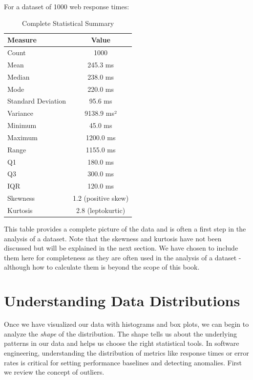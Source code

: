 \begin{example}

For a dataset of 1000 web response times:

\begin{table}[htbp]
\centering
\renewcommand{\arraystretch}{1.3}
\begin{tabular}{|l|c|}
\hline
\textbf{Measure} & \textbf{Value} \\
\hline
Count & 1000 \\
Mean & 245.3 ms \\
Median & 238.0 ms \\
Mode & 220.0 ms \\
Standard Deviation & 95.6 ms \\
Variance & 9138.9 ms² \\
Minimum & 45.0 ms \\
Maximum & 1200.0 ms \\
Range & 1155.0 ms \\
Q1 & 180.0 ms \\
Q3 & 300.0 ms \\
IQR & 120.0 ms \\
Skewness & 1.2 (positive skew) \\
Kurtosis & 2.8 (leptokurtic) \\
\hline
\end{tabular}
\caption{Complete Statistical Summary}
\label{tab:summary_stats}
\end{table}
\end{example}

This table provides a complete picture of the data and is often a first step in the analysis of a dataset. Note that the skewness and kurtosis have not been discussed but will be explained in the next section. We have chosen to include them here for completeness as they are often used in the analysis of a dataset - although how to calculate them is beyond the scope of this book.


\section{Understanding Data Distributions} \label{sec:data_distributions}
Once we have visualized our data with histograms and box plots, we can begin to analyze the \textit{shape} of the distribution. The shape tells us about the underlying patterns in our data and helps us choose the right statistical tools. In software engineering, understanding the distribution of metrics like response times or error rates is critical for setting performance baselines and detecting anomalies. First we review the concept of outliers.

